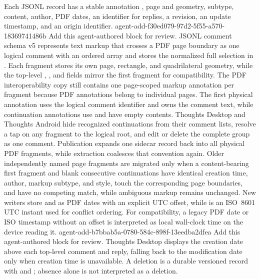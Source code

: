 Each JSONL record has a stable annotation , page and geometry, subtype, content, author, PDF dates, an  identifier for replies, a revision, an update timestamp, and an origin identifier.
\agentProposedEdit
  {agent-add-f30ed079-97d2-5f55-a570-18369741486b}
  {Add this agent-authored block for review.}
  {}
  {JSONL comment schema v5 represents text markup that crosses a PDF page boundary as one logical comment with an ordered  array and stores the normalized full selection in .
Each fragment stores its own page, rectangle, and quadrilateral geometry, while the top-level , , and  fields mirror the first fragment for compatibility.
The PDF interoperability copy still contains one page-scoped markup annotation per fragment because PDF annotations belong to individual pages.
The first physical annotation uses the logical comment identifier and owns the comment text, while continuation annotations use  and have empty contents.
Thoughts Desktop and Thoughts Android hide recognized continuations from their comment lists, resolve a tap on any fragment to the logical root, and edit or delete the complete group as one comment.
Publication expands one sidecar record back into all physical PDF fragments, while extraction coalesces that convention again.
Older independently named page fragments are migrated only when a content-bearing first fragment and blank consecutive continuations have identical creation time, author, markup subtype, and style, touch the corresponding page boundaries, and have no competing match, while ambiguous markup remains unchanged.}
New writers store  and  as PDF dates with an explicit UTC offset, while  is an ISO~8601 UTC instant used for conflict ordering.
For compatibility, a legacy PDF date or ISO timestamp without an offset is interpreted as local wall-clock time on the device reading it.
\agentProposedEdit
  {agent-add-b7bbab5a-0780-584c-898f-13eedba2dfea}
  {Add this agent-authored block for review.}
  {}
  {Thoughts Desktop displays the creation date above each top-level comment and reply, falling back to the modification date only when creation time is unavailable.}
A deletion is a durable versioned record with  and ; absence alone is not interpreted as a deletion.
